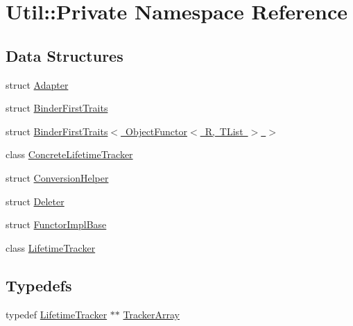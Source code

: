 \hypertarget{namespaceUtil_1_1Private}{}\section{Util\+:\+:Private Namespace Reference}
\label{namespaceUtil_1_1Private}
\subsection*{Data Structures}
\begin{DoxyCompactItemize}
\item 
struct \mbox{\hyperlink{structUtil_1_1Private_1_1Adapter}{Adapter}}
\item 
struct \mbox{\hyperlink{structUtil_1_1Private_1_1BinderFirstTraits}{Binder\+First\+Traits}}
\item 
struct \mbox{\hyperlink{structUtil_1_1Private_1_1BinderFirstTraits_3_01ObjectFunctor_3_01R_00_01TList_01_4_01_4}{Binder\+First\+Traits$<$ Object\+Functor$<$ R, T\+List $>$ $>$}}
\item 
class \mbox{\hyperlink{classUtil_1_1Private_1_1ConcreteLifetimeTracker}{Concrete\+Lifetime\+Tracker}}
\item 
struct \mbox{\hyperlink{structUtil_1_1Private_1_1ConversionHelper}{Conversion\+Helper}}
\item 
struct \mbox{\hyperlink{structUtil_1_1Private_1_1Deleter}{Deleter}}
\item 
struct \mbox{\hyperlink{structUtil_1_1Private_1_1FunctorImplBase}{Functor\+Impl\+Base}}
\item 
class \mbox{\hyperlink{classUtil_1_1Private_1_1LifetimeTracker}{Lifetime\+Tracker}}
\end{DoxyCompactItemize}
\subsection*{Typedefs}
\begin{DoxyCompactItemize}
\item 
typedef \mbox{\hyperlink{classUtil_1_1Private_1_1LifetimeTracker}{Lifetime\+Tracker}} $\ast$$\ast$ \mbox{\hyperlink{namespaceUtil_1_1Private_a51d35478cde8e0af0d19ef32c88bf016}{Tracker\+Array}}
\end{DoxyCompactItemize}
